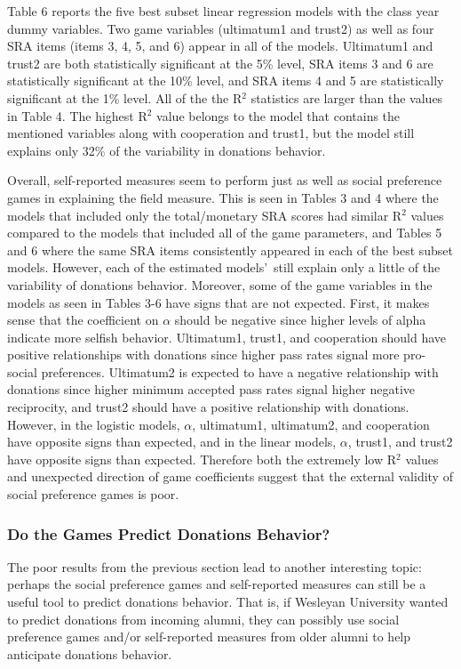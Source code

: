 \documentclass[12pt]{article}
\begin{document}
Table 6 reports the five best subset linear regression models with the class year dummy variables. Two game variables (ultimatum1 and trust2) as well as four SRA items (items 3, 4, 5, and 6) appear in all of the models. Ultimatum1 and trust2 are both statistically significant at the 5\% level, SRA items 3 and 6 are statistically significant at the 10\% level, and SRA items 4 and 5 are statistically significant at the 1\% level. All of the the R$^{2}$ statistics are larger than the values in Table 4. The highest R$^{2}$ value belongs to the model that contains the mentioned variables along with cooperation and trust1, but the model still explains only 32\% of the variability in donations behavior.

Overall, self-reported measures seem to perform just as well as social preference games in explaining the field measure. This is seen in Tables 3 and 4 where the models that included only the total/monetary SRA scores had similar R$^2$ values compared to the models that included all of the game parameters, and Tables 5 and 6 where the same SRA items consistently appeared in each of the best subset models. However, each of the estimated models\rq \ still explain only a little of the variability of donations behavior. Moreover, some of the game variables in the models as seen in Tables 3-6 have signs that are not expected. First, it makes sense that the coefficient on \(\alpha\) should be negative since higher levels of alpha indicate more selfish behavior. Ultimatum1, trust1, and cooperation should have positive relationships with donations since higher pass rates signal more pro-social preferences. Ultimatum2 is expected to have a negative relationship with donations since higher minimum accepted pass rates signal higher negative reciprocity, and trust2 should have a positive relationship with donations. However, in the logistic models, \(\alpha\), ultimatum1, ultimatum2, and cooperation have opposite signs than expected, and in the linear models, \(\alpha\), trust1, and trust2 have opposite signs than expected. Therefore both the extremely low R$^{2}$ values and unexpected direction of game coefficients suggest that the external validity of social preference games is poor.

\subsubsection{Do the Games Predict Donations Behavior?}

The poor results from the previous section lead to another interesting topic: perhaps the social preference games and self-reported measures can still be a useful tool to predict donations behavior. That is, if Wesleyan University wanted to predict donations from incoming alumni, they can possibly use social preference games and/or self-reported measures from older alumni to help anticipate donations behavior.
\end{document}
